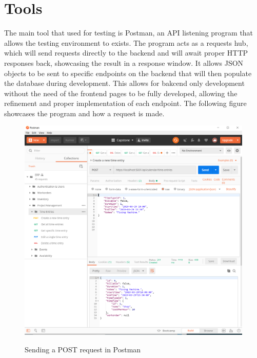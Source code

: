 {{{{{{{{{{\section{Tools}
The main tool that used for testing is Postman, an API listening program that allows the testing environment to exists. The program acts as a requests hub, which will send requests directly to the backend and will await proper HTTP responses back, showcasing the result in a response window. It allows JSON objects to be sent to specific endpoints on the backend that will then populate the database during development. This allows for bakcend only development without the need of the frontend pages to be fully developed, allowing the refinement and proper implementation of each endpoint. The following figure showcases the program and how a request is made. 
\begin{figure}[H]
	\centering
	\includegraphics[width=5in]{Postman.png}\\
	\caption{Sending a POST request in Postman}
	\label{fig:tobias}
\end{figure}


}}}}}}}}}}

